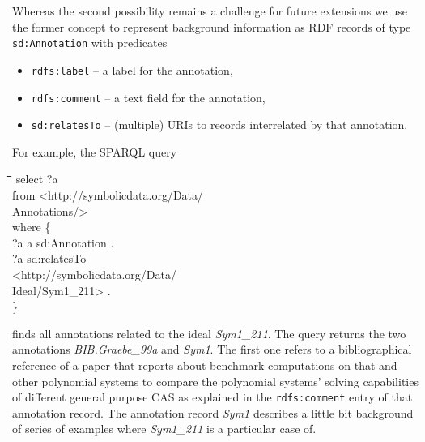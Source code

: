 \documentclass[a4paper,11pt]{article}
\newenvironment{code}{\par\small\tt\footnotesize \begin{tabbing}
\hskip12pt\=\hskip12pt\=\hskip12pt\=\hskip12pt\=\hskip5cm\=\hskip5cm\=\kill}
{\end{tabbing}\normalsize}
\begin{document}
\begin{multicols}{2}
Whereas the second possibility remains a challenge for future {\SD} extensions
we use the former concept to represent background information as RDF records of
type \texttt{sd:Annotation} with predicates
\begin{itemize}
\item \texttt{rdfs:label} -- a label for the annotation,
\item \texttt{rdfs:comment} -- a text field for the annotation,
\item \texttt{sd:relatesTo} -- (multiple) URIs to records interrelated by that
  annotation.
\end{itemize}
For example, the SPARQL query
\begin{code}
select ?a \\
from <http://symbolicdata.org/Data/\\\>\> Annotations/> \\
where \{\+\\
?a a sd:Annotation . \\
?a sd:relatesTo \\\> <http://symbolicdata.org/Data/\\\>\> Ideal/Sym1\_211>
. \-\\ 
\}
\end{code}
finds all annotations related to the ideal \emph{Sym1\_211}.  The query returns
the two annotations \emph{BIB.Graebe\_99a} and \emph{Sym1}.  The first one
refers to a bibliographical reference of a paper that reports about benchmark
computations on that and other polynomial systems to compare the polynomial
systems' solving capabilities of different general purpose CAS as explained in
the \texttt{rdfs:comment} entry of that annotation record.  The annotation
record \emph{Sym1} describes a little bit background of series of examples
where \emph{Sym1\_211} is a particular case of.


\end{multicols}
\end{document}
